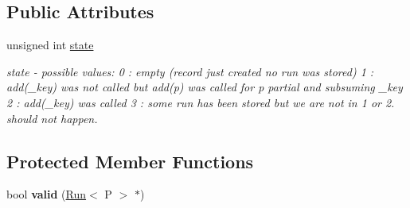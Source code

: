 \subsection*{Public Attributes}
\begin{DoxyCompactItemize}
\item 
unsigned int \mbox{\hyperlink{classRecord_a9b17378a46d2026b86632728f820d804}{state}}
\begin{DoxyCompactList}\small\item\em state -\/ possible values\+: 0 \+: empty (record just created no run was stored) 1 \+: add(\+\_\+key) was not called but add(p) was called for p partial and subsuming \+\_\+key 2 \+: add(\+\_\+key) was called 3 \+: some run has been stored but we are not in 1 or 2. should not happen. \end{DoxyCompactList}\end{DoxyCompactItemize}
\subsection*{Protected Member Functions}
\begin{DoxyCompactItemize}
\item 
\mbox{\label{classRecord_a6ea298ae02397c6b390ac098f2ed9a66}} 
bool {\bfseries valid} (\mbox{\hyperlink{classRun}{Run}}$<$ P $>$ $\ast$)
\end{DoxyCompactItemize}
